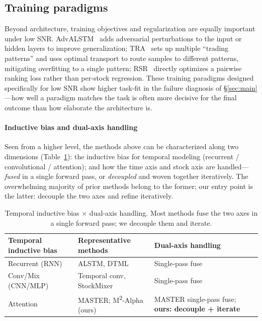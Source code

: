 \documentclass[a4paper,11pt]{article}
\newcommand{\msqa}{\texorpdfstring{M\textsuperscript{2}-Alpha}{M2-Alpha}} %
\begin{document}
\subsection{Training paradigms}\label{sec:rw-train}
Beyond architecture, training objectives and regularization are equally
important under low SNR. AdvALSTM~\cite{advalstm} adds adversarial perturbations
to the input or hidden layers to improve generalization; TRA~\cite{tra} sets up
multiple ``trading patterns'' and uses optimal transport to route samples to
different patterns, mitigating overfitting to a single pattern; RSR~\cite{rsr}
directly optimizes a pairwise ranking loss rather than per-stock regression.
These training paradigms designed specifically for low SNR show higher task-fit
in the failure diagnosis of \S\ref{sec:main}---how well a paradigm matches the
task is often more decisive for the final outcome than how elaborate the
architecture is.

\paragraph{Inductive bias and dual-axis handling}
Seen from a higher level, the methods above can be characterized along two
dimensions (Table~\ref{tab:cnn-track}): the inductive bias for temporal modeling
(recurrent / convolutional / attention); and how the time axis and stock axis
are handled---\emph{fused} in a single forward pass, or \emph{decoupled} and
woven together iteratively. The overwhelming majority of prior methods belong
to the former; our entry point is the latter: decouple the two axes and refine
iteratively.

\begin{table}[H]
\centering
\caption{Temporal inductive bias $\times$ dual-axis handling. Most methods fuse
the two axes in a single forward pass; we decouple them and iterate.}
\label{tab:cnn-track}
\begin{tabularx}{\linewidth}{l>{\raggedright\arraybackslash}X>{\raggedright\arraybackslash}X}
\toprule
Temporal inductive bias & Representative methods & Dual-axis handling \\
\midrule
Recurrent (RNN)    & ALSTM, DTML            & Single-pass fuse \\
Conv/Mix (CNN/MLP) & Temporal conv, StockMixer & Single-pass fuse \\
Attention          & MASTER; \msqa{} (ours) & MASTER single-pass fuse; \textbf{ours: decouple + iterate} \\
\bottomrule
\end{tabularx}
\end{table}
\end{document}
